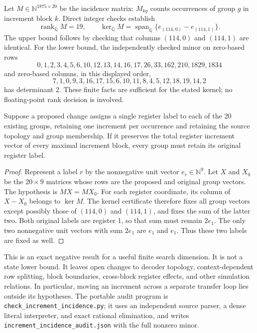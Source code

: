 Let $M\in\mathbb N^{1875\times20}$ be the incidence matrix: $M_{kg}$
counts occurrences of group $g$ in increment block $k$.  Direct integer
checks establish
\[
 \operatorname{rank}_{\mathbb Q}M=19,\qquad
 \ker_{\mathbb Q}M
 =\operatorname{span}_{\mathbb Q}
 \{e_{(114,0)}-e_{(114,1)}\}.
\]
The upper bound follows by checking that columns $(114,0)$ and $(114,1)$
are identical.  For the lower bound, the independently checked minor on
zero-based rows
\[
 0,1,2,3,4,5,6,10,12,13,14,16,17,26,33,162,210,1829,1834
\]
and zero-based columns, in this displayed order,
\[
 7,1,0,9,3,16,17,15,6,10,11,8,4,5,12,18,19,14,2
\]
has determinant 2.  These finite facts are sufficient for the stated
kernel; no floating-point rank decision is involved.

\begin{theorem}
Suppose a proposed change assigns a single register label to each of the
20 existing groups, retaining one increment per occurrence and retaining
the source topology and group membership.  If it preserves the total
register increment vector of every maximal increment block, every group
must retain its original register label.
\end{theorem}
\begin{proof}
Represent a label $r$ by the nonnegative unit vector $e_r\in\mathbb N^9$.
Let $X$ and $X_0$ be the $20\times9$ matrices whose rows are the proposed
and original group vectors.  The hypothesis is $MX=MX_0$.
For each register coordinate, its column of $X-X_0$ belongs to $\ker M$.
The kernel certificate therefore fixes all group vectors except possibly
those of $(114,0)$ and $(114,1)$, and fixes the sum of the latter two.
Both original labels are register 1, so that sum must remain $2e_1$.
The only two nonnegative unit vectors with sum $2e_1$ are $e_1$ and
$e_1$.  Thus these two labels are fixed as well.
\end{proof}

This is an exact negative result for a useful finite search dimension.
It is not a state lower bound.  It leaves open changes to decoder topology,
context-dependent row splitting, block boundaries, cross-block register
effects, and other simulation relations.  In particular, moving an
increment across a separate transfer loop lies outside its hypotheses.
The portable audit program is \texttt{check\_increment\_incidence.py};
it uses an independent source parser, a dense literal interpreter, and
exact rational elimination, and writes
\texttt{increment\_incidence\_audit.json} with the full nonzero minor.
